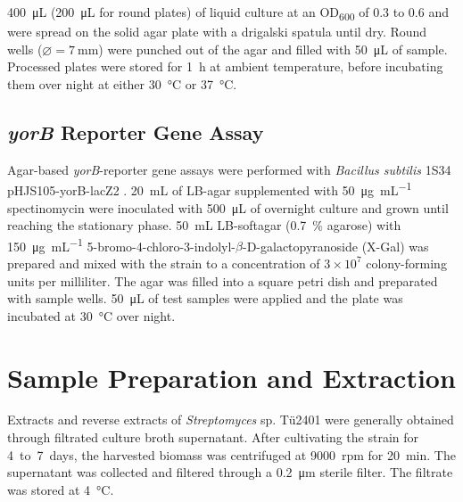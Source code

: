 	\SI{400}{\micro\liter} (\SI{200}{\micro\liter} for round plates) of liquid culture at an OD\textsubscript{600} of 0.3 to 0.6 and were spread on the solid agar plate with a drigalski spatula until dry. Round wells ($\varnothing=\SI{7}{\milli\meter}$) were punched out of the agar and filled with \SI{50}{\micro\liter} of sample. Processed plates were stored for \SI{1}{\hour} at ambient temperature, before incubating them over night at either \SI{30}{\celsius} or \SI{37}{\celsius}.


	\subsection{\emph{yorB} Reporter Gene Assay} %
	\label{sub:yorb_reporter_gene_assay}

	Agar-based \textit{yorB}-reporter gene assays were performed with \textit{Bacillus subtilis} 1S34 pHJS105-yorB-lacZ2 \autocite{Urban2007}. \SI{20}{\milli\liter} of LB-agar supplemented with \SI{50}{\micro\gram\per\milli\liter} spectinomycin were inoculated with \SI{500}{\micro\liter} of overnight culture and grown until reaching the stationary phase. \SI{50}{\milli\liter} LB-softagar (0.7~\% agarose) with \SI{150}{\micro\gram\per\milli\liter} 5-bromo-4-chloro-3-indolyl-$\beta$-D-galactopyranoside (X-Gal) was prepared and mixed with the strain to a concentration of $3\times10^7$	colony-forming units per milliliter. The agar was filled into a square petri dish and preparated with sample wells. \SI{50}{\micro\liter} of test samples were applied and the plate was incubated at \SI{30}{\celsius} over night.



\section{Sample Preparation and Extraction} %
\label{sec:sample_preparation_and_extraction}

Extracts and reverse extracts of \emph{Streptomyces} sp. Tü2401 were generally obtained through filtrated culture broth supernatant. After  cultivating the strain for 4~to~7~days, the harvested biomass was centrifuged at 9000~rpm for \SI{20}{\minute}. The supernatant was collected and filtered through a \SI{0.2}{\micro\meter} sterile filter. The filtrate was stored at \SI{4}{\celsius}.

